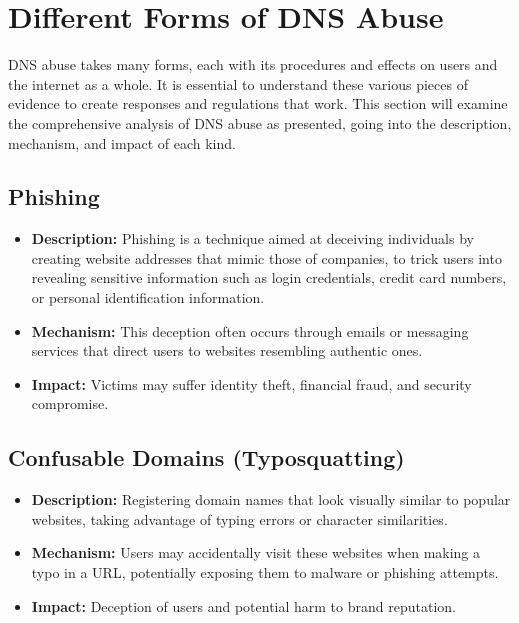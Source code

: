 \section{Different Forms of DNS Abuse}

DNS abuse takes many forms, each with its procedures and effects on users and the internet as a whole. It is essential to understand these various pieces of evidence to create responses and regulations that work. This section will examine the comprehensive analysis of DNS abuse as presented, going into the description, mechanism, and impact of each kind.

\subsection{Phishing}
\begin{itemize}
    \item \textbf{Description:} Phishing is a technique aimed at deceiving individuals by creating website addresses that mimic those of companies, to trick users into revealing sensitive information such as login credentials, credit card numbers, or personal identification information.\cite{webinarcare2023dnsstats}
    \item \textbf{Mechanism:} This deception often occurs through emails or messaging services that direct users to websites resembling authentic ones.\cite{jakobsson2006phishing}
    \item \textbf{Impact:} Victims may suffer identity theft, financial fraud, and security compromise.
\end{itemize}

\subsection{Confusable Domains (Typosquatting)}
\begin{itemize}
    \item \textbf{Description:} Registering domain names that look visually similar to popular websites, taking advantage of typing errors or character similarities.\cite{inta2023dnstypo}
    \item \textbf{Mechanism:} Users may accidentally visit these websites when making a typo in a URL, potentially exposing them to malware or phishing attempts.
    \item \textbf{Impact:} Deception of users and potential harm to brand reputation.\cite{edelman2008typosquatting}
\end{itemize}

